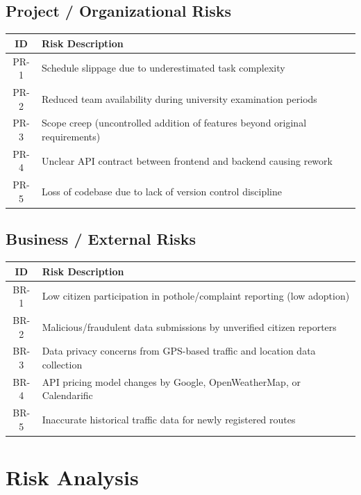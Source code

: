 \documentclass[12pt,a4paper]{article}
\begin{document}
\subsection{Project / Organizational Risks}

\begin{center}
\begin{tabular}{c l}
\toprule
\textbf{ID} & \textbf{Risk Description} \\
\midrule
PR-1 & Schedule slippage due to underestimated task complexity \\
PR-2 & Reduced team availability during university examination periods \\
PR-3 & Scope creep (uncontrolled addition of features beyond original requirements) \\
PR-4 & Unclear API contract between frontend and backend causing rework \\
PR-5 & Loss of codebase due to lack of version control discipline \\
\bottomrule
\end{tabular}
\end{center}

\subsection{Business / External Risks}

\begin{center}
\begin{tabular}{c l}
\toprule
\textbf{ID} & \textbf{Risk Description} \\
\midrule
BR-1 & Low citizen participation in pothole/complaint reporting (low adoption) \\
BR-2 & Malicious/fraudulent data submissions by unverified citizen reporters \\
BR-3 & Data privacy concerns from GPS-based traffic and location data collection \\
BR-4 & API pricing model changes by Google, OpenWeatherMap, or Calendarific \\
BR-5 & Inaccurate historical traffic data for newly registered routes \\
\bottomrule
\end{tabular}
\end{center}

\section{Risk Analysis}
\end{document}
